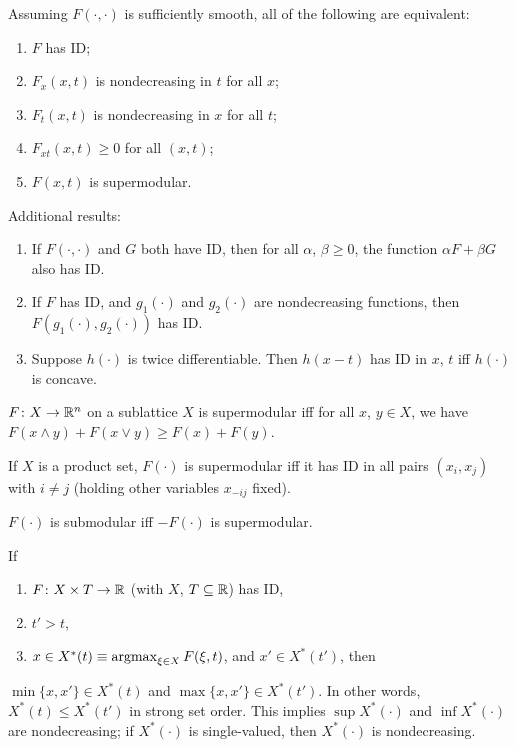 \documentclass[8pt,letterpaper, landscape]{extarticle} %
\begin{document}
\begin{multicols}{3}
\begin{description}
Assuming $ F (\cdot , \cdot) $ is sufficiently smooth, all of the following are equivalent:
\begin{enumerate}
\item $ F $ has ID;
\item $ F_x (x,t) $ is nondecreasing in $ t $ for all $ x $;
\item $ F_t (x,t) $ is nondecreasing in $ x $ for all $ t $;
\item $ F_{xt}(x,t) \geq 0 $  for all $ (x,t) $;
\item $ F(x, t) $ is supermodular.
\end{enumerate}
Additional results:
\begin{enumerate}
\item If $ F (\cdot , \cdot) $ and $ G $ both have ID, then for all $ \alpha $, $ \beta \geq 0 $, the function $ \alpha F + \beta G $ also has ID.
\item If $ F $ has ID, and $ g_1 (\cdot) $ and $ g_2 (\cdot) $ are nondecreasing functions, then $ F(g_1(\cdot), g_2(\cdot)) $ has ID.
\item Suppose $ h (\cdot) $ is twice differentiable. Then $ h(x-t) $ has ID in $ x $, $ t $ iff $ h (\cdot) $ is concave.
\end{enumerate}

 $ F \colon X \to \mathbb{R}^n $ on a sublattice $ X $ is supermodular iff for all $ x $, $ y \in X $, we have $ F(x \wedge y) + F(x \vee y) \geq F(x) + F(y) $.

If $ X $ is a product set, $ F (\cdot) $ is supermodular iff it has ID in all pairs $ (x_i , x_j) $ with $ i \neq j $ (holding other variables $ x_{-ij} $ fixed).

 $ F(\cdot) $ is submodular iff $ -F(\cdot) $ is supermodular.

 If
\begin{enumerate}
\item $ F \colon X \times T \to \mathbb{R} $ (with $ X $, $ T \subseteq \mathbb{R} $) has ID,
\item $ t' > t $,
\item $ x \in X^*(t) \equiv \operatorname*{argmax}_{\xi \in X} F(\xi, t) $, and $ x' \in X^*(t') $, then
\end{enumerate}
$ \min \{ x, x' \} \in X^*(t) $ and $ \max \{ x, x' \} \in X^*(t') $. In other words, $ X^*(t) \leq X^*(t') $ in strong set order. This implies $ \sup X^*(\cdot) $ and $ \inf X^*(\cdot) $ are nondecreasing; if $ X^*(\cdot) $ is single-valued, then $ X^*(\cdot) $ is nondecreasing.


\end{description}
\end{multicols}
\end{document}
